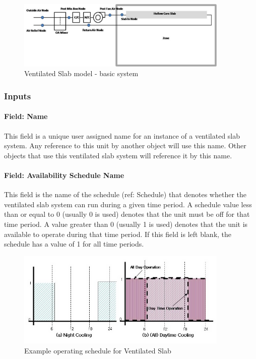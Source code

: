 \begin{figure}[hbtp] %
\centering
\includegraphics[width=0.9\textwidth, height=0.9\textheight, keepaspectratio=true]{media/image321.png}
\caption{Ventilated Slab model - basic system \protect \label{fig:ventilated-slab-model-basic-system}}
\end{figure}

\subsubsection{Inputs}\label{inputs-10-014}

\paragraph{Field: Name}\label{field-name-10-012}

This field is a unique user assigned name for an instance of a ventilated slab system. Any reference to this unit by another object will use this name. Other objects that use this ventilated slab system will reference it by this name.

\paragraph{Field: Availability Schedule Name}\label{field-availability-schedule-name-9-001}

This field is the name of the schedule (ref: Schedule) that denotes whether the ventilated slab system can run during a given time period. A schedule value less than or equal to 0 (usually 0 is used) denotes that the unit must be off for that time period. A value greater than 0 (usually 1 is used) denotes that the unit is available to operate during that time period. If this field is left blank, the schedule has a value of 1 for all time periods.

\begin{figure}[hbtp] %
\centering
\includegraphics[width=0.9\textwidth, height=0.9\textheight, keepaspectratio=true]{media/image322.png}
\caption{Example operating schedule for Ventilated Slab \protect \label{fig:example-operating-schedule-for-ventilated}}
\end{figure}

